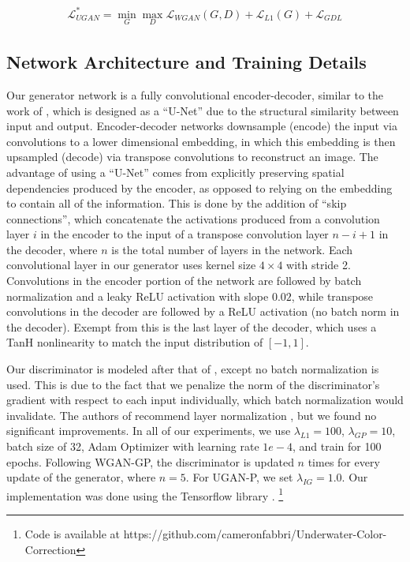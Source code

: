 \documentclass[conference,reqno]{IEEEtran}
\begin{document}
\begin{equation}
   \begin{aligned}
      \mathcal{L}_{UGAN}^* = \min\limits_{G}\max\limits_{D} \mathcal{L}_{WGAN}(G,D) + \mathcal{L}_{L1}(G) + \mathcal{L}_{GDL}
   \end{aligned}
\end{equation}


\subsection{Network Architecture and Training Details}
Our generator network is a fully convolutional encoder-decoder, similar to the work of \cite{isola2016image}, which is
designed as a ``U-Net'' \cite{ronneberger2015u} due to the structural similarity between input and output.
Encoder-decoder networks downsample (encode) the input via convolutions to a lower dimensional embedding, in which
this embedding is then upsampled (decode) via transpose convolutions to reconstruct an image. The advantage of using
a ``U-Net'' comes from explicitly preserving spatial dependencies produced by the encoder, as opposed to relying on the
embedding to contain all of the information. This is done by the addition of ``skip connections'', which concatenate
the activations produced from a convolution layer $i$ in the encoder to the input of a transpose convolution layer
$n-i+1$ in the decoder, where $n$ is the total number of layers in the network. Each convolutional layer in our
generator uses kernel size $4 \times 4$ with stride 2. Convolutions in the encoder portion of the network are followed
by batch normalization \cite{pmlr-v37-ioffe15} and a leaky ReLU activation with slope $0.02$, while transpose
convolutions in the decoder are followed by a ReLU activation \cite{nair2010rectified} (no batch norm in the decoder).
Exempt from this is the last
layer of the decoder, which uses a TanH nonlinearity to match the input distribution of $[-1, 1]$. 

Our discriminator is modeled after that of \cite{radford2015unsupervised}, except no batch normalization is used. This
is due to the fact that we penalize the norm of the discriminator's gradient with respect to each input individually,
which batch normalization would invalidate. The authors of \cite{gulrajani2017improved} recommend layer normalization
\cite{ba2016layer}, but we found no significant improvements. In all of our experiments, we use $\lambda_{L1} = 100$,
$\lambda_{GP} = 10$, batch size of 32, Adam Optimizer \cite{kingma2014adam} with learning rate $1e-4$, and train for 100 epochs.
Following WGAN-GP, the discriminator is updated $n$ times for every update of the generator, where $n = 5$.
For UGAN-P, we set $\lambda_{IG} = 1.0$.
Our implementation was done using the Tensorflow library \cite{abadi2016tensorflow}.
\footnote{Code is available at https://github.com/cameronfabbri/Underwater-Color-Correction}
\end{document}
